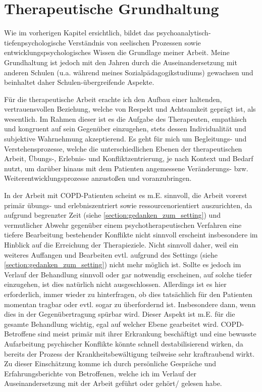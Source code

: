 \section{Therapeutische Grundhaltung} 
Wie im vorherigen Kapitel ersichtlich, bildet das psychoanalytisch-tiefenpsychologische Verständnis von seelischen Prozessen sowie entwicklungspsychologisches Wissen die Grundlage meiner Arbeit. Meine Grundhaltung ist jedoch mit den Jahren durch die Auseinandersetzung mit anderen Schulen (u.a. während meines Sozialpädagogikstudiums) gewachsen und beinhaltet daher Schulen-übergreifende Aspekte. 

Für die therapeutische Arbeit erachte ich den Aufbau einer haltenden, vertrauensvollen Beziehung, welche von Respekt und Achtsamkeit geprägt ist, als wesentlich. 
Im Rahmen dieser ist es die Aufgabe des Therapeuten, empathisch und kongruent auf sein Gegenüber einzugehen, stets dessen Individualität und subjektive Wahrnehmung akzeptierend. 
Es geht für mich um Begleitungs- und Verstehensprozesse, welche die unterschiedlichen Ebenen der therapeutischen Arbeit, Übungs-, Erlebnis- und Konfliktzentrierung, je nach Kontext und Bedarf nutzt, um darüber hinaus mit dem Patienten angemessene Veränderungs- bzw. Weiterentwicklungsprozesse anzustoßen und voranzubringen. 

In der Arbeit mit COPD-Patienten scheint es m.E. sinnvoll, die Arbeit vorerst primär übungs- und erlebniszentriert sowie ressourcenorientiert auszurichten, da aufgrund begrenzter Zeit (siehe \ref{section:gedanken_zum_setting}) und vermutlicher Abwehr gegenüber einem psychotherapeutischen Verfahren eine tiefere Bearbeitung bestehender Konflikte nicht sinnvoll erscheint insbesondere im Hinblick auf die Erreichung der Therapieziele. Nicht sinnvoll daher, weil ein weiteres Auffangen und Bearbeiten evtl. aufgrund des Settings (siehe \ref{section:gedanken_zum_setting}) nicht mehr möglich ist. Sollte es jedoch im Verlauf der Behandlung sinnvoll oder gar notwendig erscheinen, auf solche tiefer einzugehen, ist dies natürlich nicht ausgeschlossen. Allerdings ist es hier erforderlich, immer wieder zu hinterfragen, ob dies tatsächlich für den Patienten momentan tragbar oder evtl. sogar zu überfordernd ist. Insbesondere dann, wenn dies in der Gegenübertragung spürbar wird. Dieser Aspekt ist m.E. für die gesamte Behandlung wichtig, egal auf welcher Ebene gearbeitet wird. COPD-Betroffene sind meist primär mit ihrer Erkrankung beschäftigt und eine bewusste Aufarbeitung psychischer Konflikte könnte schnell destabilisierend wirken, da bereits der Prozess der Krankheitsbewältigung teilweise sehr kraftraubend wirkt. Zu dieser Einschätzung komme ich durch persönliche Gespräche und Erfahrungsberichte von Betroffenen, welche ich im Verlauf der Auseinandersetzung mit der Arbeit geführt oder gehört/ gelesen habe. 

